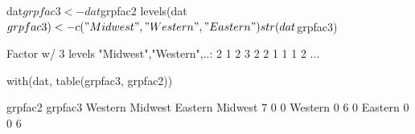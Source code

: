 \begin{Schunk}
\begin{Sinput}
  dat$grpfac3 <- dat$grpfac2
  levels(dat$grpfac3) <- c("Midwest","Western","Eastern")
  str(dat$grpfac3)
\end{Sinput}
\begin{Soutput}
 Factor w/ 3 levels "Midwest","Western",..: 2 1 2 3 2 2 1 1 1 2 ...
\end{Soutput}
\begin{Sinput}
  with(dat, table(grpfac3, grpfac2))
\end{Sinput}
\begin{Soutput}
         grpfac2
grpfac3   Western Midwest Eastern
  Midwest       7       0       0
  Western       0       6       0
  Eastern       0       0       6
\end{Soutput}
\end{Schunk}
